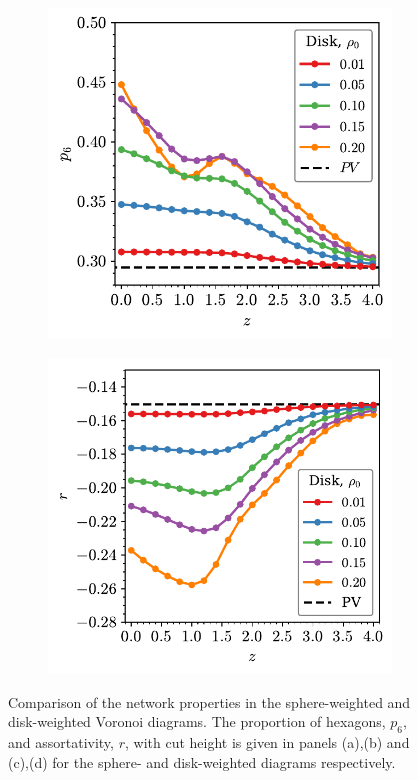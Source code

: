 \begin{figure}
       \begin{subfigure}[b]{0.46\textwidth}
         \centering
         \includegraphics[width=\textwidth]{./figures/quasi2d/p6_z_3d_disk.pdf}
         \caption{}
         \label{fig:prc}
     \end{subfigure}
     \hfill
      \begin{subfigure}[b]{0.48\textwidth}
         \centering
         \includegraphics[width=\textwidth]{./figures/quasi2d/r_z_3d_disk.pdf}
         \caption{}
         \label{fig:prd}
     \end{subfigure}
     \hfill
     
	\caption{Comparison of the network properties in the sphere\--weighted and disk\--weighted Voronoi diagrams.
	The proportion of hexagons, $p_6$, and assortativity, $r$, with cut height is given in panels (a),(b) and (c),(d) for the sphere\-- and disk\--weighted diagrams respectively.}
	\label{fig:pr}
\end{figure}


